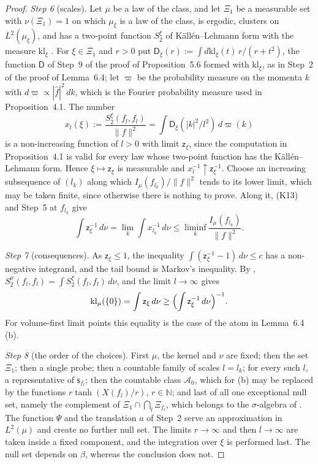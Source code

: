 \documentclass[11pt]{amsart}
\theoremstyle{definition}
\begin{document}
\begin{proof}
\emph{Step 6} (scales).
Let $\mu$ be a law of the class, and let $\Xi_1$ be a measurable set with $\nu(\Xi_1)=1$ on which $\mu_\xi$ is a law of the class, is ergodic, clusters on $L^2(\mu_\xi)$, and has a two-point function $S_2^\xi$ of K\"all\'en--Lehmann form with the measure $\mathrm{kl}_\xi$ \cite[Theorem~1.3\,(b)(v); Theorem~1.4, Part~I\,(d)--(f)]{QEDII}.
For $\xi\in\Xi_1$ and $r>0$ put $\mathsf D_\xi(r):=\int d\mathrm{kl}_\xi(t)\,r/(r+t^2)$, the function $\mathsf D$ of Step~9 of the proof of Proposition~5.6 formed with $\mathrm{kl}_\xi$, as in Step~2 of the proof of Lemma~6.4;
let $\varpi$ be the probability measure on the momenta $k$ with $d\varpi\propto|\hat f|^2\,dk$, which is the Fourier probability measure used in Proposition~4.1.
The number
\begin{equation*}
x_l(\xi):=\frac{S_2^\xi(f_l,f_l)}{\|f\|^2}=\int\mathsf D_\xi(|k|^2/l^2)\,d\varpi(k)
\end{equation*}
is a non-increasing function of $l>0$ with limit $\mathsf z_\xi$, since the computation in Proposition~4.1 is valid for every law whose two-point function has the K\"all\'en--Lehmann form.
Hence $\xi\mapsto\mathsf z_\xi$ is measurable and $x_l^{-1}\uparrow\mathsf z_\xi^{-1}$.
Choose an increasing subsequence of $(l_k)$ along which $I_\mu(f_{l_k})/\|f\|^2$ tends to its lower limit, which may be taken finite, since otherwise there is nothing to prove.
Along it, (K13) and Step~5 at $f_{l_k}$ give
\begin{equation*}
\int\mathsf z_\xi^{-1}\,d\nu=\lim_k\int x_{l_k}^{-1}\,d\nu\le\liminf_k\frac{I_\mu(f_{l_k})}{\|f\|^2}.
\end{equation*}

\emph{Step 7} (consequences).
As $\mathsf z_\xi\le1$, the inequality $\int(\mathsf z_\xi^{-1}-1)\,d\nu\le c$ has a non-negative integrand, and the tail bound is Markov's inequality.
By \cite[Proposition~45.6\,(a$'$)]{QEDIII}, $S_2^\mu(f_l,f_l)=\int S_2^\xi(f_l,f_l)\,d\nu$, and the limit $l\to\infty$ gives
\begin{equation*}
\mathrm{kl}_\mu(\{0\})=\int\mathsf z_\xi\,d\nu\ge\Bigl(\int\mathsf z_\xi^{-1}\,d\nu\Bigr)^{-1}.
\end{equation*}
For volume-first limit points this equality is the case of the atom in Lemma~6.4\,(b).

\emph{Step 8} (the order of the choices).
First $\mu$, the kernel and $\nu$ are fixed;
then the set $\Xi_1$;
then a single probe;
then a countable family of scales $l=l_k$;
for every such $l$, a representative of $\mathsf s_{f_l}$;
then the countable class $\mathcal A_0$, which for (b) may be replaced by the functions $r\tanh(X(f_l)/r)$, $r\in\mathbb N$;
and last of all one exceptional null set, namely the complement of $\Xi_1\cap\bigcap_l\Xi_{f_l}$, which belongs to the $\sigma$-algebra of \cite[(n7)]{QEDIII}.
The function $\Psi$ and the translation $a$ of Step~2 serve an approximation in $L^2(\mu)$ and create no further null set.
The limits $r\to\infty$ and then $l\to\infty$ are taken inside a fixed component, and the integration over $\xi$ is performed last.
The null set depends on $\beta$, whereas the conclusion does not.
\end{proof}
\end{document}
